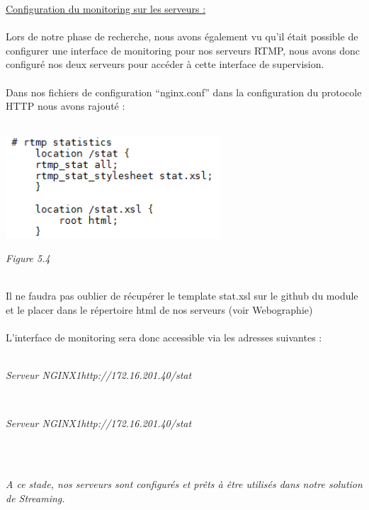 \documentclass{report}
\begin{document}
    \underline{ Configuration du monitoring sur les serveurs :}
    \\
    \\
    Lors de notre phase de recherche, nous avons également vu qu’il était possible de configurer une interface de monitoring pour nos serveurs RTMP, nous avons donc configuré nos deux serveurs pour accéder à cette interface de supervision. 
    \\
    \\
    Dans nos fichiers de configuration “nginx.conf” dans la configuration du protocole HTTP nous avons rajouté :
    \\
    \\

   \begin{center}
    \includegraphics[width=8cm]{img/conf3.PNG}
    
    \textit{\small{Figure 5.4}}
    \end{center}

    \\
    Il ne faudra pas oublier de récupérer le template stat.xsl sur le github du module et le placer dans le répertoire html de nos serveurs (voir Webographie)
    \\
    \\
    L’interface de monitoring sera donc accessible via les adresses suivantes :
    \\
    \\
    \begin{center}
    
    \textit{Serveur NGINX1\rightarrow	http://172.16.201.40/stat}
    
    \end{center}   
    \\
    \begin{center}
    
    \textit{Serveur NGINX1\rightarrow	http://172.16.201.40/stat}
    
    \end{center}
    \\
    \\
     \begin{center}
    \textit{A ce stade, nos serveurs sont configurés et prêts à être utilisés dans notre solution de Streaming.}
    \end{center}
    \\
    \\
\end{document}
